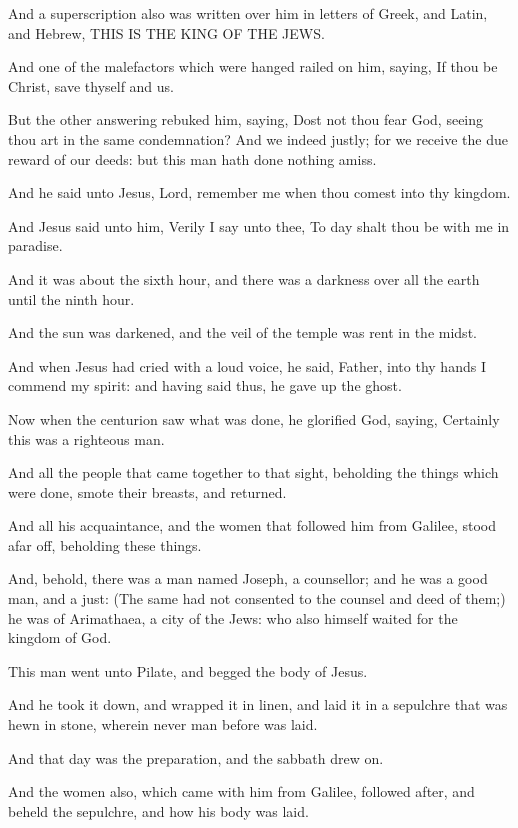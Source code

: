 \Verse And a superscription also was written over him in letters of Greek, and Latin, and Hebrew, THIS IS THE KING OF THE JEWS.

\Verse And one of the malefactors which were hanged railed on him, saying, If thou be Christ, save thyself and us.

\Verse But the other answering rebuked him, saying, Dost not thou fear God, seeing thou art in the same condemnation?  \Verse And we indeed justly; for we receive the due reward of our deeds: but this man hath done nothing amiss.

\Verse And he said unto Jesus, Lord, remember me when thou comest into thy kingdom.

\Verse And Jesus said unto him, Verily I say unto thee, To day shalt thou be with me in paradise.

\Verse And it was about the sixth hour, and there was a darkness over all the earth until the ninth hour.

\Verse And the sun was darkened, and the veil of the temple was rent in the midst.

\Verse And when Jesus had cried with a loud voice, he said, Father, into thy hands I commend my spirit: and having said thus, he gave up the ghost.

\Verse Now when the centurion saw what was done, he glorified God, saying, Certainly this was a righteous man.

\Verse And all the people that came together to that sight, beholding the things which were done, smote their breasts, and returned.

\Verse And all his acquaintance, and the women that followed him from Galilee, stood afar off, beholding these things.

\Verse And, behold, there was a man named Joseph, a counsellor; and he was a good man, and a just: \Verse (The same had not consented to the counsel and deed of them;) he was of Arimathaea, a city of the Jews: who also himself waited for the kingdom of God.

\Verse This man went unto Pilate, and begged the body of Jesus.

\Verse And he took it down, and wrapped it in linen, and laid it in a sepulchre that was hewn in stone, wherein never man before was laid.

\Verse And that day was the preparation, and the sabbath drew on.

\Verse And the women also, which came with him from Galilee, followed after, and beheld the sepulchre, and how his body was laid.

